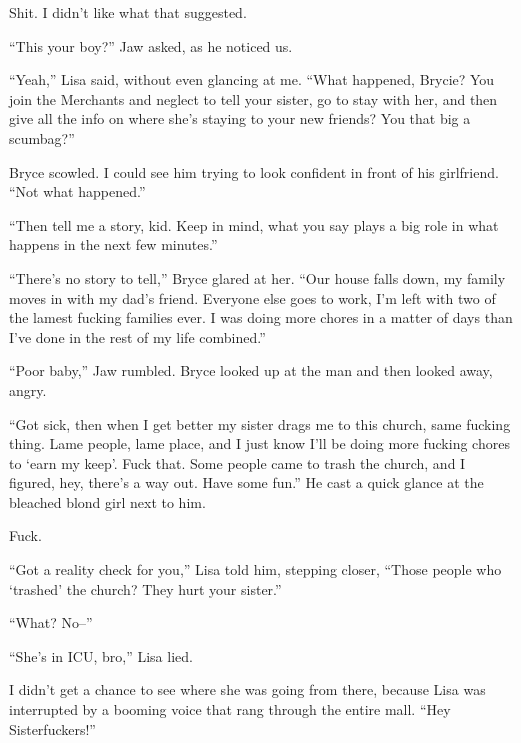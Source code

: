 Shit.  I didn't like what that suggested.



``This your boy?'' Jaw asked, as he noticed us.



``Yeah,'' Lisa said, without even glancing at me.  ``What happened, Brycie?  You join the Merchants and neglect to tell your sister, go to stay with her, and then give all the info on where she's staying to your new friends?  You that big a scumbag?''



Bryce scowled.  I could see him trying to look confident in front of his girlfriend.  ``Not what happened.''



``Then tell me a story, kid.  Keep in mind, what you say plays a big role in what happens in the next few minutes.''



``There's no story to tell,'' Bryce glared at her.  ``Our house falls down, my family moves in with my dad's friend.  Everyone else goes to work, I'm left with two of the lamest fucking families ever.  I was doing more chores in a matter of days than I've done in the rest of my life combined.''



``Poor baby,'' Jaw rumbled.  Bryce looked up at the man and then looked away, angry.



``Got sick, then when I get better my sister drags me to this church, same fucking thing.  Lame people, lame place, and I just know I'll be doing more fucking chores to `earn my keep'.  Fuck that.  Some people came to trash the church, and I figured, hey, there's a way out.  Have some fun.''  He cast a quick glance at the bleached blond girl next to him.



Fuck.



``Got a reality check for you,'' Lisa told him, stepping closer, ``Those people who `trashed' the church?  They hurt your sister.''



``What?  No--''



``She's in ICU, bro,'' Lisa lied.



I didn't get a chance to see where she was going from there, because Lisa was interrupted by a booming voice that rang through the entire mall.  ``Hey Sisterfuckers!''



